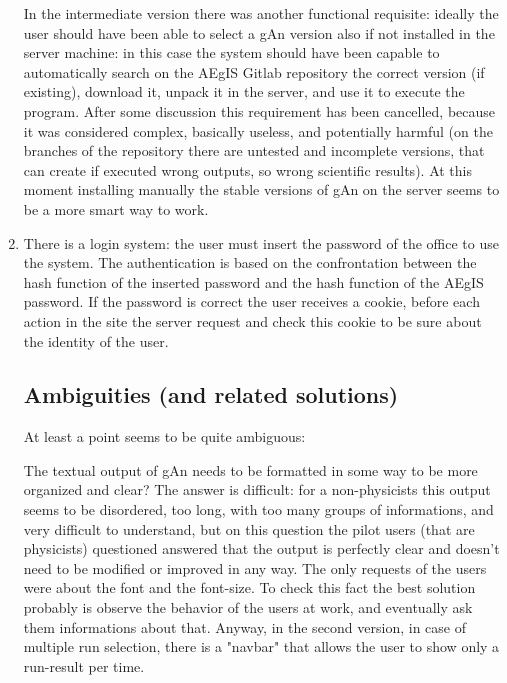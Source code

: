 \begin{enumerate}
In the intermediate version there was another functional requisite: ideally the user should have been able to select a gAn version also if not installed in the server machine: in this case the system should have been capable to automatically search on the AEgIS Gitlab repository the correct version (if existing), download it, unpack it in the server, and use it to execute the program. 
After some discussion this requirement has been cancelled, because it was considered complex, basically useless, and potentially harmful (on the branches of the repository there are untested and incomplete versions, that can create if executed wrong outputs, so wrong scientific results). At this moment installing manually the stable versions of gAn on the server seems to be a more smart way to work.

\item There is a login system: the user must insert the password of the office to use the system. The authentication is based on the confrontation between the hash function of the inserted password and the hash function of the AEgIS password. If the password is correct the user receives a cookie, before each action in the site the server request and check this cookie to be sure about the identity of the user.  


\subsection{Ambiguities (and related solutions)}

At least a point seems to be quite ambiguous: 

The textual output of gAn needs to be formatted in some way to be more organized and clear? 
The answer is difficult: for a non-physicists this output seems to be disordered, too long, with too many groups of informations, and very difficult to understand, but on this question the pilot users (that are physicists) questioned answered that the output is perfectly clear and doesn't need to be modified or improved in any way. The only requests of the users were about the font and the font-size. To check this fact the best solution probably is observe the behavior of the users at work, and eventually ask them informations about that.
Anyway, in the second version, in case of multiple run selection, there is a "navbar" that allows the user to show only a run-result per time.

\end{enumerate}
